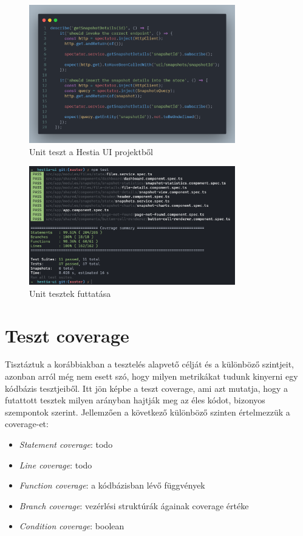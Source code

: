 \begin{figure}[H]
    \centering
    \includegraphics[width=0.8\textwidth]{images/unit-test.png}
    \caption{Unit teszt a Hestia UI projektből}
    \label{fig:unit-test-example}
\end{figure}

\begin{figure}[H]
    \centering
    \includegraphics[width=0.8\textwidth]{images/testRun.png}
    \caption{Unit tesztek futtatása}
    \label{fig:unit-test-run-example}
\end{figure}


\section{Teszt coverage}

Tisztáztuk a korábbiakban a tesztelés alapvető célját és a különböző szintjeit, azonban arról még nem esett szó, hogy milyen metrikákat tudunk kinyerni egy kódbázis tesztjeiből. Itt jön képbe a teszt coverage, ami azt mutatja, hogy a futattott tesztek milyen arányban hajtják meg az éles kódot, bizonyos szempontok szerint. Jellemzően a következő különböző szinten értelmezzük a coverage-et:
\begin{itemize}
    \item \textit{Statement coverage}: todo
    \item \textit{Line coverage}: todo
    \item \textit{Function coverage}: a kódbázisban lévő függvények
    \item \textit{Branch coverage}: vezérlési struktúrák ágainak coverage értéke
    \item \textit{Condition coverage}: boolean
\end{itemize}

